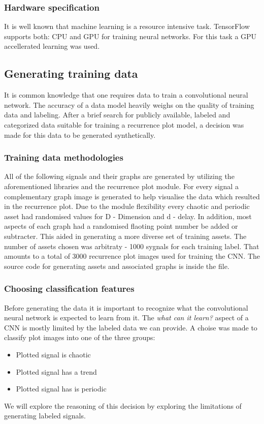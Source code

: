 \documentclass[a4paper,12pt,fleqn]{article}
\begin{document}
\subsubsection{Hardware specification}
It is well known that machine learning is a resource intensive task.
TensorFlow supports both: CPU and GPU for training neural networks.
For this task a GPU accellerated learning was used.


\subsection{Generating training data}
It is common knowledge that one requires data to train a convolutional neural network.
The accuracy of a data model heavily weighs on the quality of training data and labeling.
After a brief search for publicly available, labeled and categorized data suitable for training a recurrence plot model, a decision was made for this data to be generated synthetically.


\subsubsection{Training data methodologies}
All of the following signals and their graphs are generated by utilizing
the aforementioned libraries and the recurrence plot module.
For every signal a complementary graph image is generated to help visualise the data which resulted in the recurrence plot.
Due to the module flexibility every chaotic and periodic asset had randomised values for D - Dimension and d - delay.
In addition, most aspects of each graph had a randomised flaoting point number be added or subtracter.
This aided in generating a more diverse set of training assets.
The number of assets chosen was arbitraty - 1000 sygnals for each training label.
That amounts to a total of 3000 recurrence plot images used for training the CNN.
The source code for generating assets and associated graphs is inside the  file.


\subsubsection{Choosing classification features}
Before generating the data it is important to recognize what the convolutional neural network is expected to learn from it.
The \emph{what can it learn?} aspect of a CNN is mostly limited by the labeled data we can provide.
A choise was made to classify plot images into one of the three groups:
\begin{itemize}
  \item Plotted signal is chaotic
  \item Plotted signal has a trend
  \item Plotted signal has is periodic
\end{itemize}
We will explore the reasoning of this decision by exploring the limitations of generating labeled signals.
\end{document}
